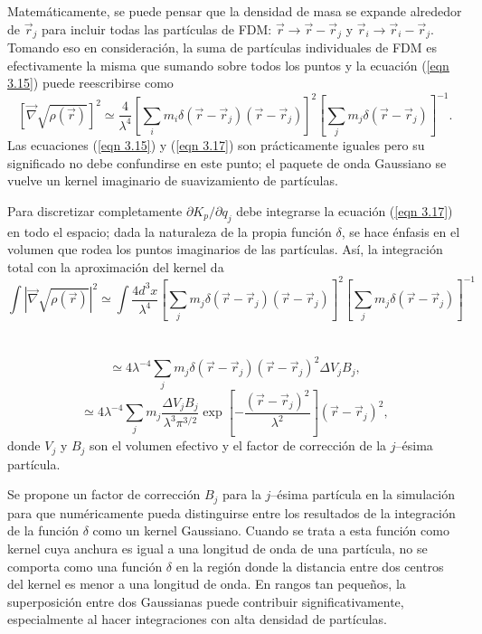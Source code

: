 \documentclass[a4paper,openright,12pt]{book}
\begin{document}
Matemáticamente, se puede pensar que la densidad de masa se expande alrededor de $\vec{r}_{j}$ para incluir todas las partículas de FDM: $\vec{r} \rightarrow \vec{r}-\vec{r}_{j}$ y $\vec{r}_{i} \rightarrow \vec{r}_{i} - \vec{r}_{j}$. Tomando eso en consideración, la suma de partículas individuales de FDM es efectivamente la misma que sumando sobre todos los puntos y la ecuación (\ref{eqn 3.15}) puede reescribirse como 
\begin{equation}
\left[\vec{\nabla}\sqrt{\rho (\vec{r})}\right]^{2} \simeq 
\frac{4}{\lambda^{4}}
\left[
\sum_{i}m_{i}\delta(\vec{r}-\vec{r}_{j})(\vec{r}-\vec{r}_{j})
\right]^{2}
\left[
\sum_{j}m_{j}\delta(\vec{r}-\vec{r}_{j})
\right]^{-1}. \label{eqn 3.17}
\end{equation}
Las ecuaciones (\ref{eqn 3.15}) y (\ref{eqn 3.17}) son prácticamente iguales pero su significado no debe confundirse en este punto; el paquete de onda Gaussiano se vuelve un kernel imaginario de suavizamiento de partículas.

Para discretizar completamente $\partial K_{p}/\partial q_{j}$ debe integrarse la ecuación (\ref{eqn 3.17}) en todo el espacio; dada la naturaleza de la propia función $\delta$, se hace énfasis en el volumen que rodea los puntos imaginarios de las partículas. Así, la integración total con la aproximación del kernel da
\begin{equation}
\int|\vec{\nabla}\sqrt{\rho (\vec{r})}|^{2}  \simeq 
\int \frac{4 d^{3}x}{\lambda^{4}}
\left[
\sum_{j} m_{j}\delta(\vec{r}-\vec{r}_{j})(\vec{r}-\vec{r}_{j})
\right]^{2}
\left[
\sum_{j}m_{j}\delta(\vec{r}-\vec{r}_{j})
\right]^{-1} \label{eqn 3.18}
\end{equation} \\\\
\begin{equation}
\simeq
4\lambda ^{-4} 
\sum_{j}m_{j}\delta(\vec{r}-\vec{r}_{j})(\vec{r}-\vec{r}_{j})^{2}\Delta V_{j}B_{j},\label{eqn 3.19}
\end{equation}
\begin{equation}
\simeq
4\lambda^{-4}
\sum_{j}m_{j}
\frac{\Delta V_{j}B_{j}}{\lambda^{3}\pi^{3/2}}
\exp\left[-\frac{(\vec{r}-\vec{r}_{j})^{2}}{\lambda^{2}}\right]
(\vec{r}-\vec{r}_{j})^{2}, \label{eqn 3.20}
\end{equation}
donde $V_{j}$ y $B_{j}$ son el volumen efectivo y el factor de corrección de la $j$--ésima partícula. 

Se propone un  factor de corrección $B_{j}$ para la $j$--ésima partícula en la simulación para que numéricamente pueda distinguirse entre los resultados de la integración de la función $\delta$ como un kernel Gaussiano. Cuando se trata a esta función como kernel cuya anchura es igual a una longitud de onda de una partícula, no se comporta como una función $\delta$ en la  región donde la distancia entre dos centros del kernel es menor a una longitud de onda. En rangos tan pequeños, la superposición entre dos Gaussianas puede contribuir significativamente, especialmente al hacer integraciones con alta densidad de partículas.
\end{document}
